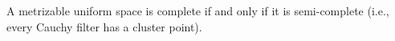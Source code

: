 A metrizable uniform space is complete if and only if it is semi-complete (i.e., every Cauchy filter has a cluster point).
